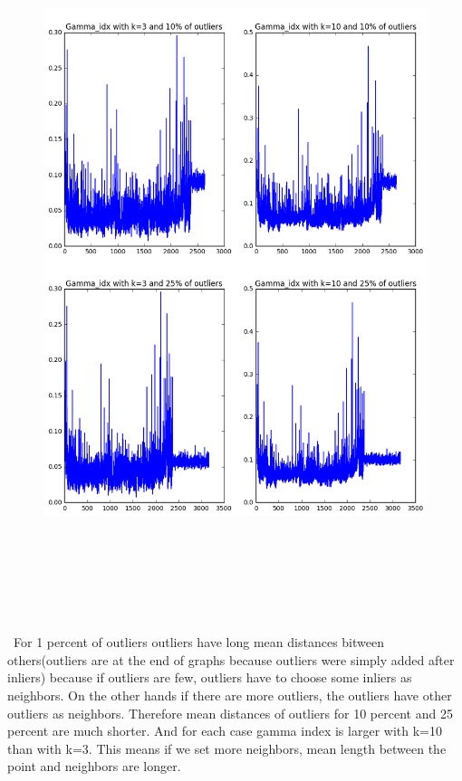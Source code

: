 \documentclass[a4paper,11pt]{article}
\begin{document}
\begin{figure}[htbp]
  \includegraphics[scale=0.5]{index2.png}
\end{figure}

\begin{verbatim}






\end{verbatim}
\ For 1 percent of outliers outliers have long mean distances bitween others(outliers are at the end of graphs because outliers were simply added after inliers) because if outliers are few, outliers have to choose some inliers as neighbors. On the other hands if there are more outliers, the outliers have other outliers as neighbors. Therefore mean distances of outliers for 10 percent and 25 percent are much shorter. And for each case gamma index is larger with k=10 than with k=3. This means if we set more neighbors, mean length between the point and neighbors are longer.
\end{document}
